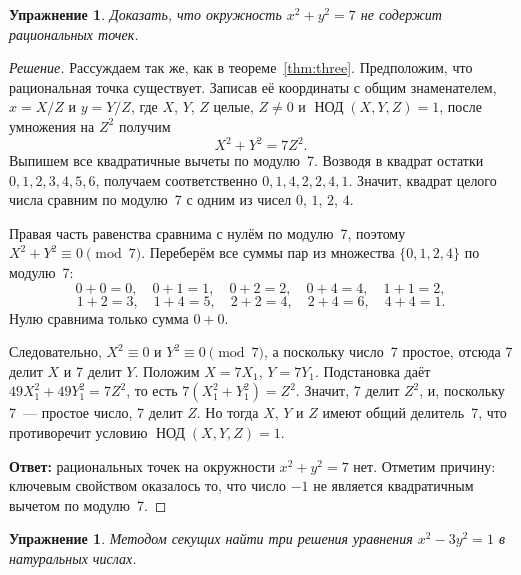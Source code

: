 \documentclass[a4paper,14pt]{extreport}
\theoremstyle{definition}
\newtheorem{exer}[thm]{Упражнение}
\newcommand{\answer}[1]{\par\medskip\noindent\textbf{Ответ:} #1}
\providecommand{\gcdru}{}\renewcommand{\gcdru}{\mathop{\text{НОД}}\nolimits}
\begin{document}
\begin{exer}\label{ex:seven}
\itshape Доказать, что окружность $x^2+y^2=7$ не содержит рациональных точек.
\end{exer}

\begin{proof}[Решение]
\normalfont
Рассуждаем так же, как в теореме~\ref{thm:three}. Предположим, что рациональная
точка существует. Записав её координаты с общим знаменателем, $x=X/Z$ и $y=Y/Z$,
где $X$, $Y$, $Z$ целые, $Z\neq0$ и $\gcdru(X,Y,Z)=1$, после
умножения на $Z^2$ получим
\[
  X^2+Y^2=7Z^2 .
\]
Выпишем все квадратичные вычеты по модулю~7. Возводя в квадрат остатки
$0,1,2,3,4,5,6$, получаем соответственно $0,1,4,2,2,4,1$. Значит, квадрат целого
числа сравним по модулю~7 с одним из чисел $0$, $1$, $2$, $4$.

Правая часть равенства сравнима с нулём по модулю~7, поэтому
$X^2+Y^2\equiv0\pmod 7$. Переберём все суммы пар из множества $\{0,1,2,4\}$ по
модулю~7:
\[
  0+0=0,\quad 0+1=1,\quad 0+2=2,\quad 0+4=4,\quad 1+1=2,
\]
\[
  1+2=3,\quad 1+4=5,\quad 2+2=4,\quad 2+4=6,\quad 4+4=1 .
\]
Нулю сравнима только сумма $0+0$.

Следовательно, $X^2\equiv0$ и $Y^2\equiv0 \pmod 7$, а поскольку число~7 простое,
отсюда 7 делит $X$ и 7 делит $Y$. Положим $X=7X_1$, $Y=7Y_1$. Подстановка даёт
$49X_1^2+49Y_1^2=7Z^2$, то есть $7(X_1^2+Y_1^2)=Z^2$. Значит, 7 делит $Z^2$, и,
поскольку 7~--- простое число, 7 делит $Z$. Но тогда $X$, $Y$ и $Z$ имеют общий
делитель~7, что противоречит условию $\gcdru(X,Y,Z)=1$.

\answer{рациональных точек на окружности $x^2+y^2=7$ нет. Отметим причину:
ключевым свойством оказалось то, что число $-1$ не является квадратичным вычетом
по модулю~7.}
\end{proof}

\begin{exer}\label{ex:pell}
\itshape Методом секущих найти три решения уравнения $x^2-3y^2=1$ в натуральных
числах.
\end{exer}
\end{document}
